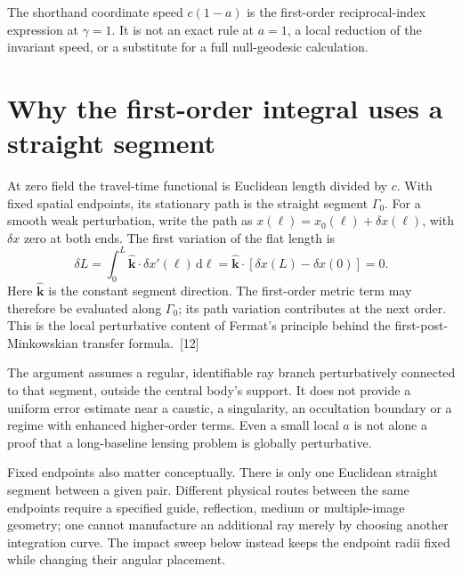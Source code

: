 \documentclass[10pt,twocolumn,letterpaper]{article}
\newcommand{\dd}{\mathrm{d}}
\begin{document}
The shorthand coordinate speed $c(1-a)$ is the first-order reciprocal-index expression at $\gamma=1$. It is not an exact rule at $a=1$, a local reduction of the invariant speed, or a substitute for a full null-geodesic calculation.


\section{Why the first-order integral uses a straight segment}
At zero field the travel-time functional is Euclidean length divided by $c$. With fixed spatial endpoints, its stationary path is the straight segment $\Gamma_0$. For a smooth weak perturbation, write the path as $x(\ell)=x_0(\ell)+\delta x(\ell)$, with $\delta x$ zero at both ends. The first variation of the flat length is
\[
 \delta L=\int_0^L\widehat{\mathbf k}\cdot\delta x'(\ell)\,\dd\ell
 =\widehat{\mathbf k}\cdot[\delta x(L)-\delta x(0)]=0.
\]
Here $\widehat{\mathbf k}$ is the constant segment direction. The first-order metric term may therefore be evaluated along $\Gamma_0$; its path variation contributes at the next order. This is the local perturbative content of Fermat's principle behind the first-post-Minkowskian transfer formula.~[12]

The argument assumes a regular, identifiable ray branch perturbatively connected to that segment, outside the central body's support. It does not provide a uniform error estimate near a caustic, a singularity, an occultation boundary or a regime with enhanced higher-order terms. Even a small local $a$ is not alone a proof that a long-baseline lensing problem is globally perturbative.

Fixed endpoints also matter conceptually. There is only one Euclidean straight segment between a given pair. Different physical routes between the same endpoints require a specified guide, reflection, medium or multiple-image geometry; one cannot manufacture an additional ray merely by choosing another integration curve. The impact sweep below instead keeps the endpoint radii fixed while changing their angular placement.
\end{document}
